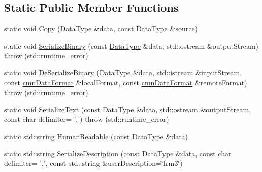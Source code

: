 \subsection*{Static Public Member Functions}
\begin{DoxyCompactItemize}
\item 
static void \hyperlink{classcmn_data_3_01vct_frame_base_3_01__rotation_type_01_4_01_4_a8fa2049183157a61bbdf3e1b32ed93bf}{Copy} (\hyperlink{classcmn_data_3_01vct_frame_base_3_01__rotation_type_01_4_01_4_a6d3becc05b41db88283c842177d23bea}{Data\-Type} \&data, const \hyperlink{classcmn_data_3_01vct_frame_base_3_01__rotation_type_01_4_01_4_a6d3becc05b41db88283c842177d23bea}{Data\-Type} \&source)
\item 
static void \hyperlink{classcmn_data_3_01vct_frame_base_3_01__rotation_type_01_4_01_4_aa6e15a5f25215267a910677d5471b0cd}{Serialize\-Binary} (const \hyperlink{classcmn_data_3_01vct_frame_base_3_01__rotation_type_01_4_01_4_a6d3becc05b41db88283c842177d23bea}{Data\-Type} \&data, std\-::ostream \&output\-Stream)  throw (std\-::runtime\-\_\-error)
\item 
static void \hyperlink{classcmn_data_3_01vct_frame_base_3_01__rotation_type_01_4_01_4_a52dbfd7c5424edfd70df03f735adee44}{De\-Serialize\-Binary} (\hyperlink{classcmn_data_3_01vct_frame_base_3_01__rotation_type_01_4_01_4_a6d3becc05b41db88283c842177d23bea}{Data\-Type} \&data, std\-::istream \&input\-Stream, const \hyperlink{classcmn_data_format}{cmn\-Data\-Format} \&local\-Format, const \hyperlink{classcmn_data_format}{cmn\-Data\-Format} \&remote\-Format)  throw (std\-::runtime\-\_\-error)
\item 
static void \hyperlink{classcmn_data_3_01vct_frame_base_3_01__rotation_type_01_4_01_4_ac3640a018200a1c0255e6caddeca4de4}{Serialize\-Text} (const \hyperlink{classcmn_data_3_01vct_frame_base_3_01__rotation_type_01_4_01_4_a6d3becc05b41db88283c842177d23bea}{Data\-Type} \&data, std\-::ostream \&output\-Stream, const char delimiter= ',')  throw (std\-::runtime\-\_\-error)
\item 
static std\-::string \hyperlink{classcmn_data_3_01vct_frame_base_3_01__rotation_type_01_4_01_4_a9398bd4ed6cd6fa26fe394e71f09f722}{Human\-Readable} (const \hyperlink{classcmn_data_3_01vct_frame_base_3_01__rotation_type_01_4_01_4_a6d3becc05b41db88283c842177d23bea}{Data\-Type} \&data)
\item 
static std\-::string \hyperlink{classcmn_data_3_01vct_frame_base_3_01__rotation_type_01_4_01_4_a769798327b1edafad7c067a1b7cff038}{Serialize\-Description} (const \hyperlink{classcmn_data_3_01vct_frame_base_3_01__rotation_type_01_4_01_4_a6d3becc05b41db88283c842177d23bea}{Data\-Type} \&data, const char delimiter= ',', const std\-::string \&user\-Description=\char`\"{}frm3\char`\"{})

\end{DoxyCompactItemize}
